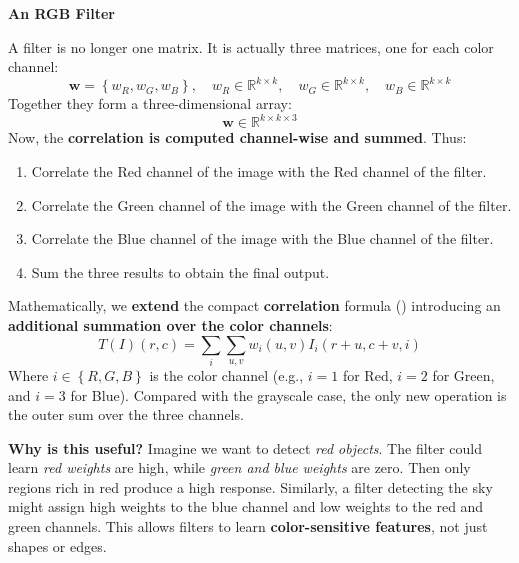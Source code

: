 \highspace
\begin{flushleft}
    \textcolor{Green3}{ \textbf{An RGB Filter}}
\end{flushleft}
A filter is no longer one matrix. It is actually three matrices, one for each color channel:
\begin{equation*}
    \mathbf{w} = \left\{ w_R, w_G, w_B \right\}, \quad w_R \in \mathbb{R}^{k \times k}, \quad w_G \in \mathbb{R}^{k \times k}, \quad w_B \in \mathbb{R}^{k \times k}
\end{equation*}
Together they form a three-dimensional array:
\begin{equation*}
    \mathbf{w} \in \mathbb{R}^{k \times k \times 3}
\end{equation*}
Now, the \textbf{correlation is computed channel-wise and summed}. Thus:
\begin{enumerate}
    \item Correlate the Red channel of the image with the Red channel of the filter.
    \item Correlate the Green channel of the image with the Green channel of the filter.
    \item Correlate the Blue channel of the image with the Blue channel of the filter.
    \item Sum the three results to obtain the final output.
\end{enumerate}
Mathematically, we \textbf{extend} the compact \textbf{correlation} formula () introducing an \textbf{additional summation over the color channels}:
\begin{equation}\label{eq:linear-filter-rgb}
    T\left(I\right)\left(r,c\right) = \sum_{i}\sum_{u,v} w_{i}\left(u,v\right) I_{i}\left(r+u,c+v,i\right)
\end{equation}
Where $i \in \left\{R,G,B\right\}$ is the color channel (e.g., $i=1$ for Red, $i=2$ for Green, and $i=3$ for Blue). Compared with the grayscale case, the only new operation is the outer sum over the three channels.

\highspace
\textcolor{Green3}{ \textbf{Why is this useful?}} Imagine we want to detect \emph{red objects}. The filter could learn \emph{red weights} are high, while \emph{green and blue weights} are zero. Then only regions rich in red produce a high response. Similarly, a filter detecting the sky might assign high weights to the blue channel and low weights to the red and green channels. This allows filters to learn \textbf{color-sensitive features}, not just shapes or edges.